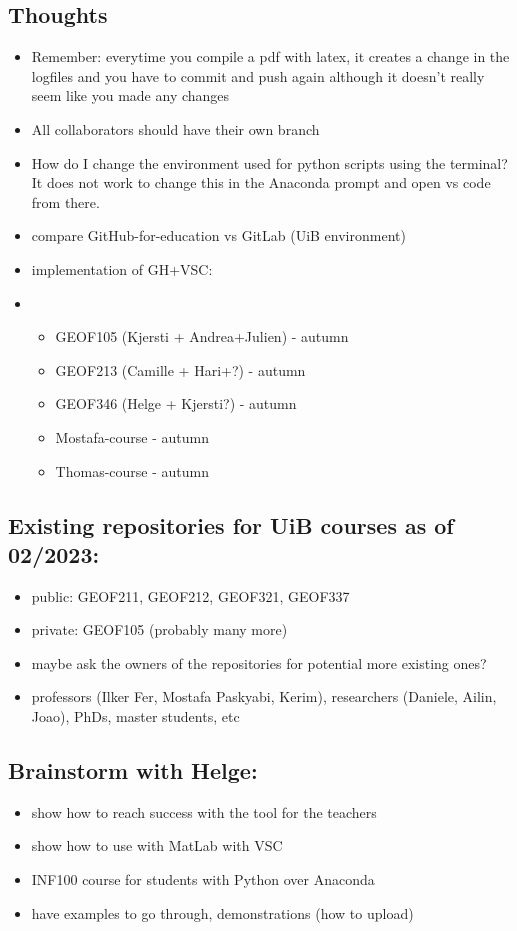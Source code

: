 \documentclass{article}
\begin{document}
\subsection*{Thoughts}
    \begin{itemize}
        \item Remember: everytime you compile a pdf with latex, it creates a 
        change in the logfiles and you have to commit and push again although 
        it doesn't really seem like you made any changes
        \item All collaborators should have their own branch
        \item How do I change the environment used for python scripts using 
        the terminal? It does not work to change this in the Anaconda prompt 
        and open vs code from there.
        \item compare GitHub-for-education vs GitLab (UiB environment)
        \item implementation of GH+VSC:
        \item \begin{itemize}
            \item GEOF105 (Kjersti + Andrea+Julien) - autumn
            \item GEOF213 (Camille + Hari+?) - autumn
            \item GEOF346 (Helge + Kjersti?) - autumn
            \item Mostafa-course - autumn
            \item Thomas-course - autumn
            \end{itemize}
    \end{itemize}

    \subsection*{Existing repositories for UiB courses as of 02/2023:}
\begin{itemize}
    \item public: GEOF211, GEOF212, GEOF321, GEOF337
    \item private: GEOF105 (probably many more)
    \item maybe ask the owners of the repositories for potential more existing ones?
    \item professors (Ilker Fer, Mostafa Paskyabi, Kerim), researchers (Daniele, Ailin, Joao), PhDs, master students, etc
\end{itemize}

\subsection*{Brainstorm with Helge:}
\begin{itemize}
    \item show how to reach success with the tool for the teachers
    \item show how to use with MatLab with VSC
    \item INF100 course for students with Python over Anaconda
    \item have examples to go through, demonstrations (how to upload)
\end{itemize}
\end{document}
